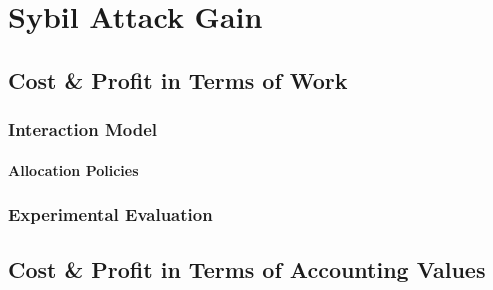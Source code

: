 \chapter{Sybil Attack Gain}
\label{chap:Sybil Attack Gain}



\section{Cost \& Profit in Terms of Work}
\label{sec:Cost & Profit in Terms of Work}


\subsection{Interaction Model}
\label{subsec:Interaction Model}

\subsubsection{Allocation Policies}
\label{subsubsec:Allocation Policies}

\subsection{Experimental Evaluation}
\label{subsec:Experimental Evaluation}



\section{Cost \& Profit in Terms of Accounting Values}
\label{sec:Cost & Profit in Terms of Accounting Values}







